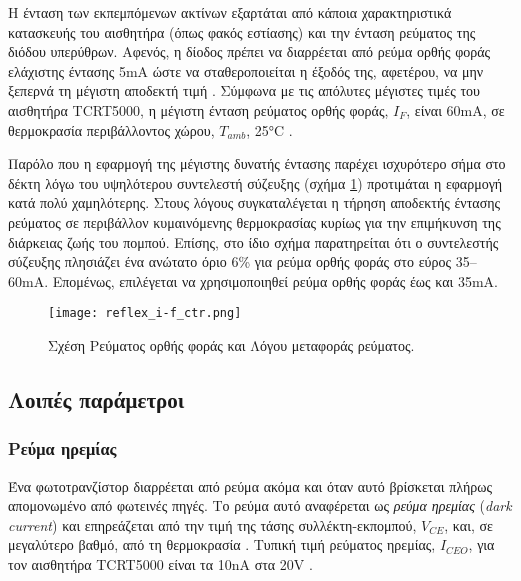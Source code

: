 Η ένταση των εκπεμπόμενων ακτίνων εξαρτάται από κάποια χαρακτηριστικά κατασκευής
του αισθητήρα (όπως φακός εστίασης) και την ένταση ρεύματος της διόδου
υπερύθρων.
Αφενός, η δίοδος πρέπει να διαρρέεται από ρεύμα ορθής φοράς ελάχιστης έντασης
5mA ώστε να σταθεροποιείται η έξοδός της, αφετέρου, να μην ξεπερνά τη μέγιστη
αποδεκτή τιμή \parencite{vishay02}. Σύμφωνα με τις απόλυτες μέγιστες τιμές του
αισθητήρα TCRT5000, η μέγιστη ένταση ρεύματος ορθής φοράς, $I_F$, είναι 60mA, σε
θερμοκρασία περιβάλλοντος χώρου, $T_{amb}$, 25°C \parencite{vishay09}.

Παρόλο που η εφαρμογή της μέγιστης δυνατής έντασης παρέχει ισχυρότερο σήμα στο
δέκτη λόγω του υψηλότερου συντελεστή σύζευξης (σχήμα \ref{fig:reflex:i-f_ctr})
προτιμάται η εφαρμογή κατά πολύ χαμηλότερης. Στους λόγους συγκαταλέγεται η
τήρηση αποδεκτής έντασης ρεύματος σε περιβάλλον κυμαινόμενης θερμοκρασίας κυρίως
για την επιμήκυνση της διάρκειας ζωής του πομπού. Επίσης, στο ίδιο σχήμα
παρατηρείται ότι ο συντελεστής σύζευξης πλησιάζει ένα ανώτατο όριο 6\% για ρεύμα
ορθής φοράς στο εύρος 35--60mA. Επομένως, επιλέγεται να χρησιμοποιηθεί ρεύμα
ορθής φοράς έως και 35mA.

\begin{figure}
    \caption{Σχέση Ρεύματος ορθής φοράς και Λόγου μεταφοράς ρεύματος.
    \label{fig:reflex:i-f_ctr}}
    \begin{center}%
    \texttt{[image: reflex\_i-f\_ctr.png]}
    \end{center}

\end{figure}

\subsection{Λοιπές παράμετροι}

\subsubsection{Ρεύμα ηρεμίας}

Ένα φωτοτρανζίστορ διαρρέεται από ρεύμα ακόμα και όταν αυτό βρίσκεται πλήρως
απομονωμένο από φωτεινές πηγές. Το ρεύμα αυτό αναφέρεται ως \emph{ρεύμα ηρεμίας}
 (\emph{dark current}) και επηρεάζεται από την τιμή της
τάσης συλλέκτη-εκπομπού, $V_{CE}$, και, σε μεγαλύτερο βαθμό, από τη θερμοκρασία
\parencite{vishay06}. Τυπική τιμή ρεύματος ηρεμίας, $I_{CEO}$, για τον αισθητήρα
TCRT5000 είναι τα 10nA στα 20V \parencite{vishay09}.

